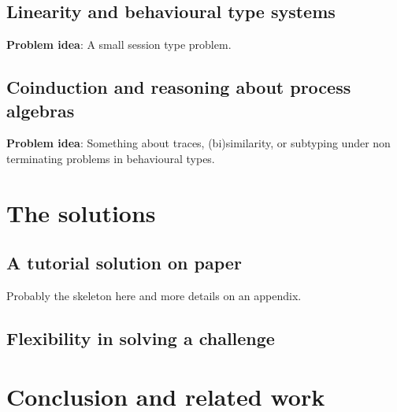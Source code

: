 \documentclass{jfp}
\begin{document}
\subsection{Linearity and behavioural type systems}

\textbf{Problem idea}: A small session type problem.

\subsection{Coinduction and reasoning about process algebras}

\textbf{Problem idea}: Something about traces, (bi)similarity, or
subtyping under non terminating problems in behavioural types.

\section{The solutions}\label{sec:solutions}

\subsection{A tutorial solution on paper}\label{sec:tutorial}

Probably the skeleton here and more details on an appendix.

\subsection{Flexibility in solving a challenge}

\section{Conclusion and related work} \label{sec:conclusion}




\label{lastpage01}
\end{document}
